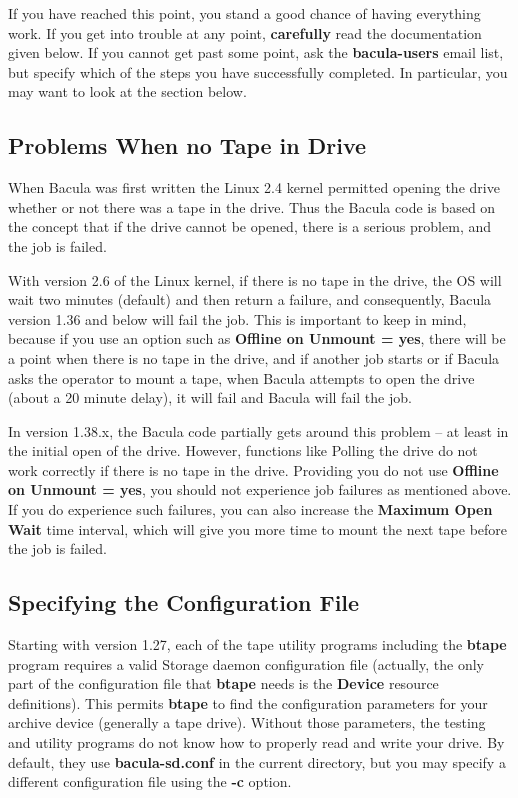 If you have reached this point, you stand a good chance of having everything
work. If you get into trouble at any point, {\bf carefully} read the
documentation given below. If you cannot get past some point, ask the {\bf
bacula-users} email list, but specify which of the steps you have successfully
completed. In particular, you may want to look at the 
 section below. 


\label{NoTapeInDrive}
\subsection{Problems When no Tape in Drive}
When Bacula was first written the Linux 2.4 kernel permitted opening the
drive whether or not there was a tape in the drive. Thus the Bacula code is
based on the concept that if the drive cannot be opened, there is a serious
problem, and the job is failed.

With version 2.6 of the Linux kernel, if there is no tape in the drive, the
OS will wait two minutes (default) and then return a failure, and consequently,
Bacula version 1.36 and below will fail the job.  This is important to keep
in mind, because if you use an option such as {\bf Offline on Unmount =
yes}, there will be a point when there is no tape in the drive, and if
another job starts or if Bacula asks the operator to mount a tape, when
Bacula attempts to open the drive (about a 20 minute delay), it will fail
and Bacula will fail the job.

In version 1.38.x, the Bacula code partially gets around this problem -- at
least in the initial open of the drive.  However, functions like Polling
the drive do not work correctly if there is no tape in the drive.
Providing you do not use {\bf Offline on Unmount = yes}, you should not
experience job failures as mentioned above.  If you do experience such
failures, you can also increase the {\bf Maximum Open Wait} time interval,
which will give you more time to mount the next tape before the job is
failed.

\subsection{Specifying the Configuration File}

Starting with version 1.27, each of the tape utility programs including the
{\bf btape} program requires a valid Storage daemon configuration file
(actually, the only part of the configuration file that {\bf btape} needs is
the {\bf Device} resource definitions). This permits {\bf btape} to find the
configuration parameters for your archive device (generally a tape drive).
Without those parameters, the testing and utility programs do not know how to
properly read and write your drive. By default, they use {\bf bacula-sd.conf}
in the current directory, but you may specify a different configuration file
using the {\bf -c} option. 

